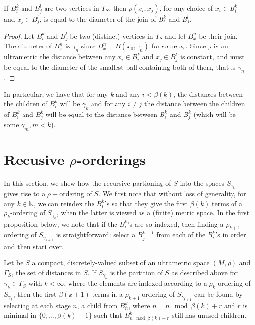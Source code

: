 \begin{lemma}
If $B^k_i$ and $B^l_j$ are two vertices in $T_S$, then $\rho(x_i,x_j)$, for any choice of  $x_i \in B^k_i$ and $x_j \in B^l_j$, is equal to the diameter of the join of  $B^k_i$ and $B^l_j$. 
\end{lemma}

\begin{proof}
Let $B^k_i$ and $B^l_j$ be two (distinct) vertices in $T_S$ and let $B^n_x$ be their join. The diameter of $B^n_x$ is $\gamma_n$ since $B^n_x=B(x_0, \gamma_n)$ for some $x_0$. Since $\rho$ is an ultrametric the distance between any  $x_i \in B^k_i$ and $x_j \in B^l_j$ is constant, and must be equal to the diameter of the smallest ball containing both of them, that is $\gamma_n$.
\end{proof}

In particular, we have that for any $k$ and any $i < \beta(k)$, the distances between the children of $B^k_i$ will be $\gamma_k$ and for any $i \neq j$ the distance between the children of $B^k_i$ and $B^k_j$ will be equal to the distance between  $B^k_i$ and $B^k_j$ (which will be some $\gamma_{m}, m <k$).\\

\section*{Recusive $\rho$-orderings}
In this section, we show how the recursive partioning of $S$ into the spaces $S_{\gamma_k}$ gives rise to a $\rho-$ordering of $S$. We first note that without loss of generality, for any $k \in \mathbb{N}$, we can reindex the $B^k_i$'s so that they give the first $\beta(k)$ terms of a $\rho_k$-ordering of $S_{\gamma_k}$, when the latter is viewed as a (finite) metric space. In the first proposition below, we note that if the $B^k_i$'s are so indexed, then finding a $\rho_{k+1}$-ordering of $S_{\gamma_{k+1}}$ is straightforward: select a $B^{k+1}_j$ from each of the $B^k_i$'s in order and then start over.\\  

\begin{proposition} 
Let be $S$ a compact, discretely-valued subset of an ultrametric space $(M, \rho)$ and $\Gamma_S$, the set of distances in $S$. If $S_{\gamma_k}$ is the partition of $S$ as described above for $\gamma_k \in \Gamma_S$ with $k < \infty$, where the elements are indexed according to a $\rho_k$-ordering of $S_{\gamma_k}$, then the first $\beta(k+1)$ terms in a $\rho_{k+1}$-ordering of $S_{\gamma_{k+1}}$ can be found by selecting at each stage $n$, a child from $B^k_{\overline{n}}$, where $\overline{n} = n \mod \beta(k) +r $ and $r$ is minimal in $\{0,\ldots,\beta(k)-1\}$ such that $B^k_{n \mod \beta(k) +r}$ still has unused children.
\end{proposition}

